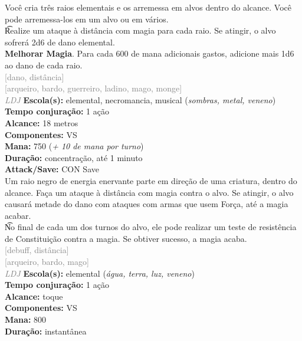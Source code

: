 \documentclass{RPG_Adventure}[2021/10/20]
\begin{document}
{\normalsize Você cria três raios elementais e os arremessa em alvos dentro do alcance. Você pode arremessa-los em um alvo ou em vários.\\\t Realize um ataque à distância com magia para cada raio. Se atingir, o alvo sofrerá 2d6 de dano elemental.\\\t \textbf{Melhorar Magia}. Para cada 600 de mana adicionais gastos, adicione mais 1d6 ao dano de cada raio.\\}
{\scriptsize \textcolor{gray}{[dano, distância]\\}}
{\scriptsize \textcolor{gray}{[arqueiro, bardo, guerreiro, ladino, mago, monge]\\}}
{\tiny \textcolor{gray}{\textit{LDJ}}}\jump{}
{\small \t \textbf{Escola(s):} elemental, necromancia, musical (\textit{sombras, metal, veneno})\\\t \textbf{Tempo conjuração:} 1 ação\\\t \textbf{Alcance:} 18 metros\\\t \textbf{Componentes:} VS\\\t \textbf{Mana:} 750 (\textit{+ 10 de mana por turno})\\\t \textbf{Duração:} concentração, até 1 minuto\\\t \textbf{Attack/Save:} CON Save\\}
{\normalsize Um raio negro de energia enervante parte em direção de uma criatura, dentro do alcance. Faça um ataque à distância com magia contra o alvo. Se atingir, o alvo causará metade do dano com ataques com armas que usem Força, até a magia acabar.\\\t No final de cada um dos turnos do alvo, ele pode realizar um teste de resistência de Constituição contra a magia. Se obtiver sucesso, a magia acaba.\\}
{\scriptsize \textcolor{gray}{[debuff, distância]\\}}
{\scriptsize \textcolor{gray}{[arqueiro, bardo, mago]\\}}
{\tiny \textcolor{gray}{\textit{LDJ}}}\jump{}
{\small \t \textbf{Escola(s):} elemental (\textit{água, terra, luz, veneno})\\\t \textbf{Tempo conjuração:} 1 ação\\\t \textbf{Alcance:} toque\\\t \textbf{Componentes:} VS\\\t \textbf{Mana:} 800\\\t \textbf{Duração:} instantânea\\}
\end{document}
